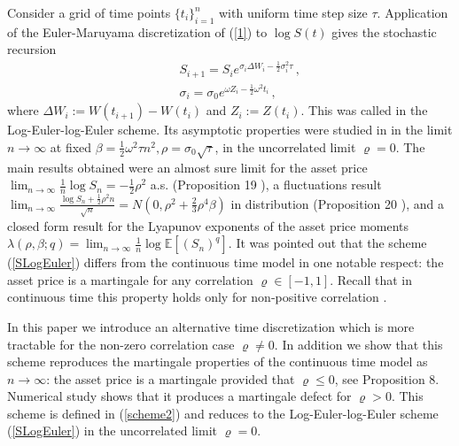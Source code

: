 \documentclass[11pt]{article}
\numberwithin{equation}{section}
\theoremstyle{plain}
\begin{document}
Consider a grid of time points $\{ t_i \}_{i=1}^n$ with 
uniform time step size $\tau$. Application of the Euler-Maruyama discretization 
of (\ref{1}) to $\log S(t)$ gives the stochastic recursion
\begin{eqnarray}\label{SLogEuler}
&& S_{i+1} = S_i e^{\sigma_i \Delta W_i - \frac12 \sigma_i^2 \tau}\,, \\
&& \sigma_i = \sigma_0 e^{\omega Z_i - \frac12 \omega^2 t_i} \,, \nonumber
\end{eqnarray}
where $\Delta W_{i}:=W(t_{i+1})-W(t_{i})$ and $Z_{i}:=Z(t_{i})$. 
This was called in \cite{PZStochVol} the Log-Euler-log-Euler scheme. 
Its asymptotic properties were studied in \cite{PZStochVol} in the limit 
$n \to \infty$ at fixed $\beta = \frac12\omega^2 \tau n^2, 
\rho = \sigma_0 \sqrt{\tau}$, in the uncorrelated limit $\varrho=0$. 
The main results obtained were an almost sure limit for the asset price
$\lim_{n\to \infty} \frac{1}{n} \log S_n = - \frac12 \rho^2$ a.s. (Proposition
19 \cite{PZStochVol}), a fluctuations result $\lim_{n\to\infty} 
\frac{\log S_n + \frac12\rho^2 n}{\sqrt{n}} = N(0,\rho^2+\frac23
\rho^4 \beta)$ in distribution (Proposition 20 \cite{PZStochVol}), and a closed form
result for the Lyapunov exponents of the asset price moments
$\lambda(\rho,\beta;q) = \lim_{n\to \infty} \frac{1}{n} \log\mathbb{E}[(S_n)^q]$.
It was pointed out that the scheme (\ref{SLogEuler}) differs from the 
continuous time model in one notable respect: the asset price is a martingale 
for any correlation $\varrho\in  [-1,1]$. Recall that in continuous time this property holds only 
for non-positive correlation \cite{BCM,Jourdain,LM}.

In this paper we introduce an alternative time discretization which is more
tractable for the non-zero correlation case $\varrho \neq 0$.
In addition we show that this scheme reproduces the martingale properties
of the continuous time model as $n\to \infty$: the asset price is
a martingale provided that $\varrho \leq 0$, see 
Proposition 8. Numerical study shows that it produces a martingale defect for 
$\varrho >0$. 
This scheme is defined in (\ref{scheme2}) and reduces to the 
Log-Euler-log-Euler scheme (\ref{SLogEuler}) in the uncorrelated limit 
$\varrho=0$.
\end{document}
